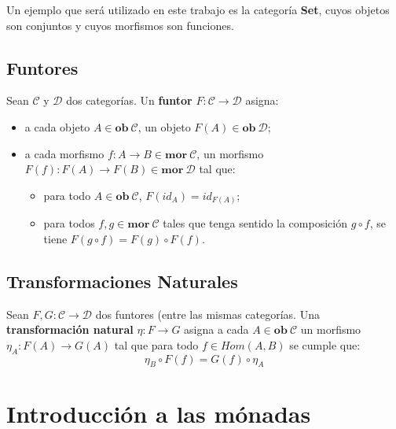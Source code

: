 \begin{itemize}[noitemsep,label=$\blacktriangleright$]
\end{itemize}

Un ejemplo que será utilizado en este trabajo es la categoría \textbf{Set}, cuyos objetos son conjuntos y cuyos morfismos son funciones. 

\subsection{Funtores}\label{previas:fun}
Sean $\mathscr{C}$ y $\mathscr{D}$ dos categorías. Un \textbf{funtor} $\mathit{F} : \mathscr{C} \rightarrow \mathscr{D}$ asigna:
\vspace{-0.75\baselineskip}
\begin{itemize}[noitemsep,label=$\blacktriangleright$]
	\item a cada objeto $A \in \mathbf{ob} \ \mathscr{C}$, un objeto $\mathit{F}(A) \in \mathbf{ob} \ \mathscr{D}$;
	\item a cada morfismo $f : A \rightarrow B \in \mathbf{mor} \ \mathscr{C}$, un morfismo $\mathit{F}(f) : \mathit{F}(A) \rightarrow \mathit{F}(B) \in \mathbf{mor} \ \mathscr{D}$ tal que: 
	\begin{itemize}[noitemsep,label=$\bullet$]
		\item para todo $A \in \mathbf{ob} \ \mathscr{C}$, $\mathit{F}(id_A) = id_{\mathit{F}(A)}$;
		\item para todos $f,g \in \mathbf{mor} \ \mathscr{C}$ tales que tenga sentido la composición $g \circ f$, se tiene $\mathit{F}(g \circ f) = \mathit{F}(g) \circ \mathit{F}(f)$.
	\end{itemize}
\end{itemize}

\subsection{Transformaciones Naturales}\label{previas:transfnat}
Sean $\mathit{F}, \mathit{G} : \mathscr{C} \rightarrow \mathscr{D}$ dos funtores (entre las mismas categorías. Una \textbf{transformación natural} $\eta : \mathit{F} \rightarrow \mathit{G}$ asigna a cada $A \in \mathbf{ob} \ \mathscr{C}$ un morfismo $\eta_A : \mathit{F}(A) \rightarrow \mathit{G}(A)$ tal que para todo $f \in Hom(A,B)$ se cumple que: 
\begin{equation*}
	\eta_B \circ \mathit{F}(f) = \mathit{G}(f) \circ \eta_A 
\end{equation*}

\section{Introducción a las mónadas}\label{monconc:monadas}

